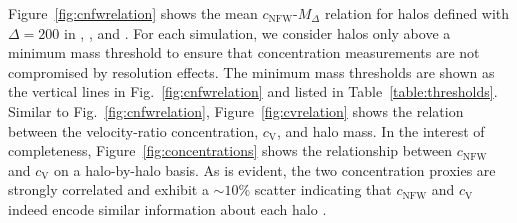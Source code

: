 \documentclass[usenatbib]{mnras}
\begin{document}
Figure~\ref{fig:cnfwrelation} shows the mean $c_{\mathrm{NFW}}$-$M_{\Delta}$ relation for halos defined with
$\Delta=200$ in \simA, \simB, and \simC. For each simulation, we consider halos only above a minimum mass threshold 
to ensure that concentration measurements are not compromised by resolution effects. The minimum mass 
thresholds are shown as the vertical lines in Fig.~\ref{fig:cnfwrelation} and listed in Table~\ref{table:thresholds}. 
Similar to Fig.~\ref{fig:cnfwrelation}, Figure~\ref{fig:cvrelation} shows the relation between the velocity-ratio concentration, $c_{\mathrm{V}}$, and halo mass. In the interest of completeness, Figure~\ref{fig:concentrations} shows the relationship 
between $c_{\mathrm{NFW}}$ and $c_{\mathrm{V}}$ on a halo-by-halo basis. As is evident, the two concentration 
proxies are strongly correlated and exhibit a $\sim 10\%$ scatter indicating that $c_{\mathrm{NFW}}$ and $c_{\mathrm{V}}$ 
indeed encode similar information about each halo .
\end{document}
